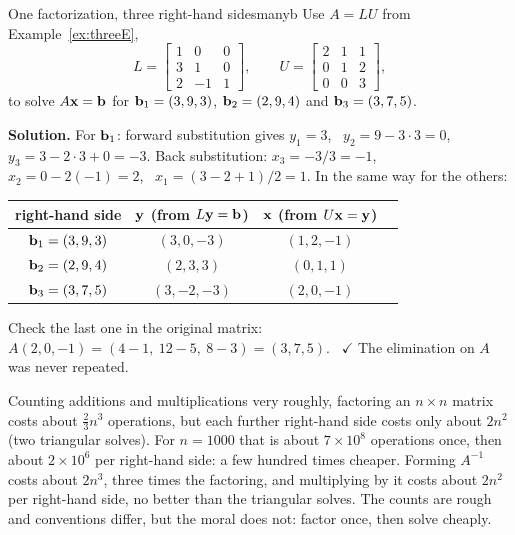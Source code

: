 \documentclass[11pt]{article}
\begin{document}
\begin{exmp}{One factorization, three right-hand sides}{manyb}
Use $A=LU$ from Example~\ref{ex:threeE},
\[
L=\begin{bmatrix}1&0&0\\3&1&0\\2&-1&1\end{bmatrix},\qquad U=\begin{bmatrix}2&1&1\\0&1&2\\0&0&3\end{bmatrix},
\]
to solve $A\mathbf{x}=\mathbf{b}$ for $\mathbf{b}_1=(3,9,3)$, $\mathbf{b}_2=(2,9,4)$ and $\mathbf{b}_3=(3,7,5)$.

\textbf{Solution.} For $\mathbf{b}_1$: forward substitution gives $y_1=3$, \ $y_2=9-3\cdot3=0$, \ $y_3=3-2\cdot3+0=-3$. Back substitution: $x_3=-3/3=-1$, \ $x_2=0-2(-1)=2$, \ $x_1=(3-2+1)/2=1$. In the same way for the others:
\begin{center}
\begin{tabular}{@{}cccc@{}}\toprule
right-hand side & $\mathbf{y}$ (from $L\mathbf{y}=\mathbf{b}$) & $\mathbf{x}$ (from $U\mathbf{x}=\mathbf{y}$) \\\midrule
$\mathbf{b}_1=(3,9,3)$ & $(3,0,-3)$ & $(1,2,-1)$\\
$\mathbf{b}_2=(2,9,4)$ & $(2,3,3)$ & $(0,1,1)$\\
$\mathbf{b}_3=(3,7,5)$ & $(3,-2,-3)$ & $(2,0,-1)$\\\bottomrule
\end{tabular}
\end{center}
Check the last one in the original matrix: $A(2,0,-1)=(4-1,\ 12-5,\ 8-3)=(3,7,5)$. \ $\checkmark$ The elimination on $A$ was never repeated.
\end{exmp}

\begin{remark}
Counting additions and multiplications very roughly, factoring an $n\times n$ matrix costs about $\tfrac23n^3$ operations, but each further right-hand side costs only about $2n^2$ (two triangular solves). For $n=1000$ that is about $7\times10^8$ operations once, then about $2\times10^6$ per right-hand side: a few hundred times cheaper. Forming $A^{-1}$ costs about $2n^3$, three times the factoring, and multiplying by it costs about $2n^2$ per right-hand side, no better than the triangular solves. The counts are rough and conventions differ, but the moral does not: factor once, then solve cheaply.
\end{remark}
\end{document}
